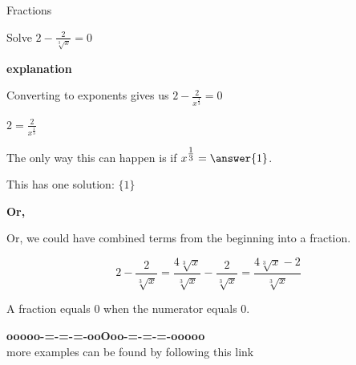 \documentclass{ximera}
\begin{document}
\begin{example}  Fractions


Solve $2 - \frac{2}{\sqrt[3]{x}} = 0$



\textbf{\textcolor{red!75!green}{explanation}} 


Converting to exponents gives us $2 - \frac{2}{x^{\tfrac{1}{3}}} = 0$


$2 = \frac{2}{x^{\tfrac{1}{3}}}$

The only way this can happen is if $x^{\tfrac{1}{3}} = \answer{1}$.

This has one solution: $\{  1  \}$






\textbf{\textcolor{blue!55!black}{Or,}} 

Or, we could have combined terms from the beginning into a fraction.


\[
2 - \frac{2}{\sqrt[3]{x}} = \frac{4\sqrt[3]{x}}{\sqrt[3]{x}} - \frac{2}{\sqrt[3]{x}} = \frac{4\sqrt[3]{x}-2}{\sqrt[3]{x}}
\]

A fraction equals $0$ when the numerator equals $0$.






\end{example}











\begin{center}
\textbf{\textcolor{green!50!black}{ooooo-=-=-=-ooOoo-=-=-=-ooooo}} \\

more examples can be found by following this link\\ 

\end{center}
\end{document}

